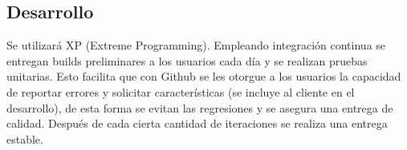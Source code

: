 \documentclass[]{article}
\begin{document}
\subsection{Desarrollo}

Se utilizar\'a XP (Extreme Programming). Empleando integraci\'on continua se entregan builds preliminares a los usuarios cada d\'ia y se realizan pruebas unitarias. Esto facilita que con Github se les otorgue a los usuarios la capacidad de reportar errores y solicitar caracter\'isticas (se incluye al cliente en el desarrollo), de esta forma se evitan las regresiones y se asegura una entrega de calidad. Despu\'es de cada cierta cantidad de iteraciones se realiza una entrega estable. 

\newpage


\end{document}
